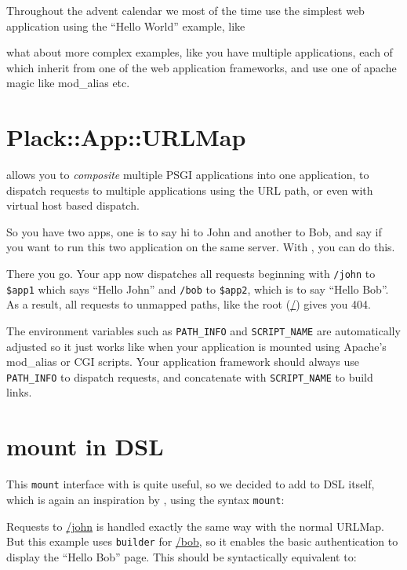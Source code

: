 Throughout the advent calendar we most of the time use the simplest web
application using the ``Hello World'' example, like

%
what about more complex examples, like you have multiple applications,
each of which inherit from one of the web application frameworks, and
use one of apache magic like mod\_alias etc.

\section{Plack::App::URLMap}\label{plackappurlmap}

 allows you to \emph{composite} multiple PSGI
applications into one application, to dispatch requests to multiple
applications using the URL path, or even with virtual host based
dispatch.


So you have two apps, one is to say hi to John and another to Bob, and
say if you want to run this two application on the same server. With
, you can do this.


There you go. Your app now dispatches all requests beginning with
\lstinline!/john! to \lstinline!$app1! which says ``Hello John'' and
\lstinline!/bob! to \lstinline!$app2!, which is to say ``Hello Bob''. As
a result, all requests to unmapped paths, like the root (\url{/}) gives
you 404.

The environment variables such as \lstinline!PATH_INFO! and
\lstinline!SCRIPT_NAME! are automatically adjusted so it just works like
when your application is mounted using Apache's mod\_alias or CGI
scripts. Your application framework should always use
\lstinline!PATH_INFO! to dispatch requests, and concatenate with
\lstinline!SCRIPT_NAME! to build links.

\section{mount in DSL}\label{mount-in-dsl}

This \lstinline!mount! interface with  is quite
useful, so we decided to add to  DSL itself, which is
again an inspiration by , using the syntax
\lstinline!mount!:


Requests to \url{/john} is handled exactly the same way with the normal
URLMap. But this example uses \lstinline!builder! for \url{/bob}, so it
enables the basic authentication to display the ``Hello Bob'' page. This
should be syntactically equivalent to:

